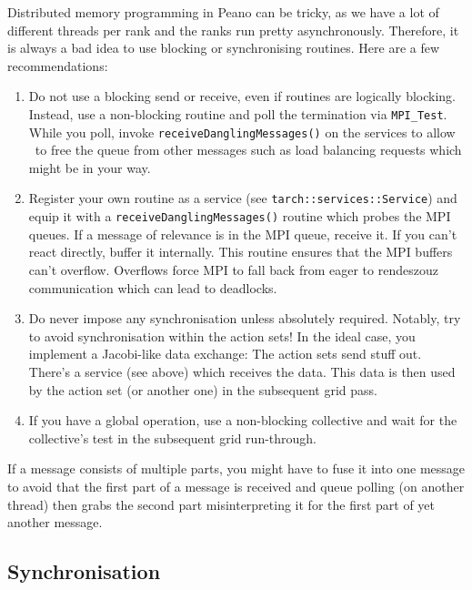 Distributed memory programming in Peano can be tricky, as we have a lot of
different threads per rank and the ranks run pretty asynchronously.
Therefore, it is always a bad idea to use blocking or synchronising routines. 
Here are a few recommendations:

\begin{enumerate}
  \item Do not use a blocking send or receive, even if routines are logically
  blocking.
  Instead, use a non-blocking routine and poll the termination via
  \texttt{MPI\_Test}.
  While you poll, invoke \texttt{receiveDanglingMessages()} on the services to
  allow \Peano\ to free the queue from other messages such as load balancing
  requests which might be in your way.
  \item Register your own routine as a service (see
  \texttt{tarch::services::Service}) and equip it with a
  \texttt{receiveDanglingMessages()} routine which probes the MPI queues. If a
  message of relevance is in the MPI queue, receive it. If you can't react
  directly, buffer it internally. This routine ensures that the MPI buffers
  can't overflow. Overflows force MPI to fall back from eager to rendeszouz
  communication which can lead to deadlocks.
  \item Do never impose any synchronisation unless absolutely required.
  Notably, try to avoid synchronisation within the action sets! In the ideal
  case, you implement a Jacobi-like data exchange: The action sets send stuff
  out.
  There's a service (see above) which receives the data. This data is then used
  by the action set (or another one) in the subsequent grid pass. 
  \item If you have a global operation, use a non-blocking collective and wait
  for the collective's test in the subsequent grid run-through.
\end{enumerate}

\begin{remark}
 If a message consists of multiple parts, you might have to fuse it into one
 message to avoid that the first part of a message is received and queue polling
 (on another thread) then grabs the second part misinterpreting it for the first
 part of yet another message.
\end{remark}


\subsection{Synchronisation}

